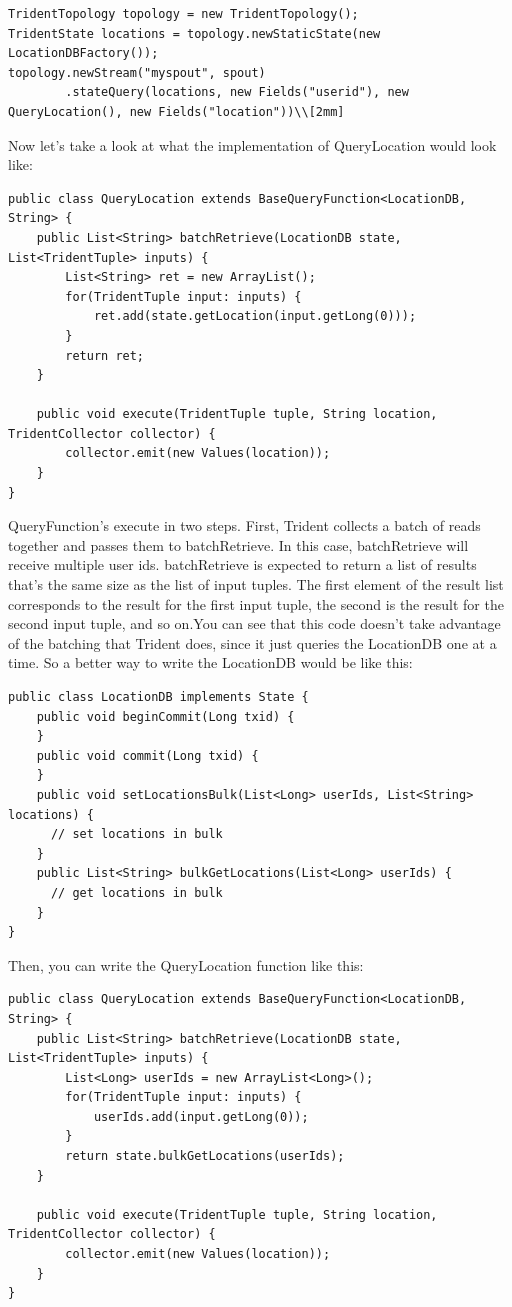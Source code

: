 \begin{verbatim}
TridentTopology topology = new TridentTopology();
TridentState locations = topology.newStaticState(new LocationDBFactory());
topology.newStream("myspout", spout)
        .stateQuery(locations, new Fields("userid"), new QueryLocation(), new Fields("location"))\\[2mm]
\end{verbatim}
Now let's take a look at what the implementation of QueryLocation would look like:\\[2mm]
\begin{verbatim}
public class QueryLocation extends BaseQueryFunction<LocationDB, String> {
    public List<String> batchRetrieve(LocationDB state, List<TridentTuple> inputs) {
        List<String> ret = new ArrayList();
        for(TridentTuple input: inputs) {
            ret.add(state.getLocation(input.getLong(0)));
        }
        return ret;
    }

    public void execute(TridentTuple tuple, String location, TridentCollector collector) {
        collector.emit(new Values(location));
    }    
}
\end{verbatim}
QueryFunction's execute in two steps. First, Trident collects a batch of reads together and passes them to batchRetrieve. In this case, batchRetrieve will receive multiple user ids. batchRetrieve is expected to return a list of results that's the same size as the list of input tuples. The first element of the result list corresponds to the result for the first input tuple, the second is the result for the second input tuple, and so on.You can see that this code doesn't take advantage of the batching that Trident does, since it just queries the LocationDB one at a time. So a better way to write the LocationDB would be like this:\\[2mm]
\begin{verbatim}
public class LocationDB implements State {
    public void beginCommit(Long txid) {    
    }
    public void commit(Long txid) {    
    }
    public void setLocationsBulk(List<Long> userIds, List<String> locations) {
      // set locations in bulk
    }
    public List<String> bulkGetLocations(List<Long> userIds) {
      // get locations in bulk
    }
}
\end{verbatim}
Then, you can write the QueryLocation function like this:\\[2mm]
\begin{verbatim}
public class QueryLocation extends BaseQueryFunction<LocationDB, String> {
    public List<String> batchRetrieve(LocationDB state, List<TridentTuple> inputs) {
        List<Long> userIds = new ArrayList<Long>();
        for(TridentTuple input: inputs) {
            userIds.add(input.getLong(0));
        }
        return state.bulkGetLocations(userIds);
    }

    public void execute(TridentTuple tuple, String location, TridentCollector collector) {
        collector.emit(new Values(location));
    }    
}
\end{verbatim}
